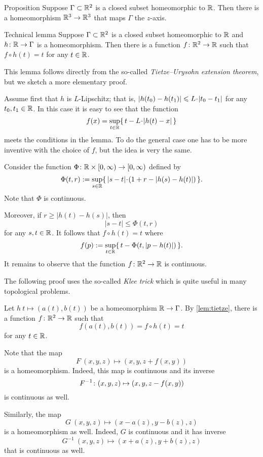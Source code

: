 \begin{thm}{Proposition}\label{prop:home-gamma-z-axis}
Suppose $\Gamma\subset\mathbb{R}^2$ is a closed subset homeomorphic to $\mathbb{R}$.
Then there is a homeomorphism $\mathbb{R}^3\to \mathbb{R}^3$ that maps $\Gamma$ the $z$-axis.
\end{thm}


\begin{thm}{Technical lemma}\label{lem:tietze}
Suppose $\Gamma\subset\mathbb{R}^2$ is a closed subset homeomorphic to $\mathbb{R}$ and $h\colon\mathbb{R}\to\Gamma$ is a homeomorphism.
Then there is a function $f\colon\mathbb{R}^2\to\mathbb{R}$ such that 
$f\circ h(t)=t$ for any $t\in \mathbb{R}$.
\end{thm}

This lemma follows directly from the so-called \emph{Tietze--Urysohn extension theorem},
but we sketch a more elementary proof.

Assume first that $h$ is $L$-Lipschitz;
that is, $|h(t_0)-h(t_1)|\le L\cdot |t_0\z-t_1|$ for any $t_0,t_1\in\mathbb{R}$.
In this case it is easy to see that the function 
\[f(x)=\sup_{t\in\RR}\{\, t-L\cdot |h(t)-x|\,\}\]
meets the conditions in the lemma.
To do the general case one has to be more inventive with the choice of $f$, but the idea is very the same.

Consider the function $\Phi\colon\mathbb{R}\times[0,\infty)\to[0,\infty)$ defined by 
\[\Phi(t,r)\df \sup_{s\in\RR} \{\,|s-t|\cdot (1+r-|h(s)-h(t)|)\,\}.\]
Note that $\Phi$ is continuous.

Moreover, if $r\ge |h(t)-h(s)|$, then
\[|s-t|\le \Phi(t,r)\]
for any $s,t\in\mathbb{R}$.
It follows that $f\circ h(t)=t$ where  
\[f(p)\mathrel{:=}\sup_{t\in\mathbb{R}}\{\,t-\Phi(t,|p-h(t)|)\,\}.\]
It remains to observe that the function $f\colon\mathbb{R}^2\to\mathbb{R}$ is continuous.
\qeds

The following proof uses the so-called \emph{Klee trick} which is quite useful in many topological problems.

Let $h\:t\mapsto (a(t),b(t))$ be a homeomorphism $\mathbb{R}\to \Gamma$.
By \ref{lem:tietze}, there is a function $f\:\RR^2\z\to\RR$ such that 
\[f(a(t),b(t))=f\circ h(t)=t\]
for any $t\in \mathbb{R}$.

Note that the map 
\[F\:(x,y,z)\mapsto (x,y,z+f(x,y))\] is a homeomorphism.
Indeed, this map is continuous and its inverse 
\[F^{-1}\:(x,y,z)\z\mapsto (x,y,z-f(x,y))\]
is continuous as well.

Similarly, the map 
\[G\:(x,y,z)\mapsto (x-a(z),y-b(z),z)\]
is a homeomorphism as well.
Indeed, $G$ is continuous and it has inverse 
\[G^{-1}\:(x,y,z)\mapsto (x+a(z),y+b(z),z)\]
that is continuous as well.

